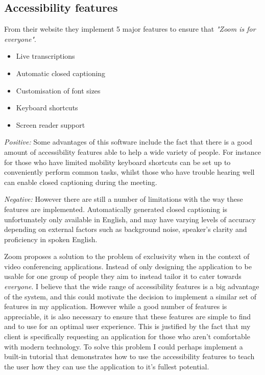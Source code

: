 \subsection*{Accessibility features}

From their website
\cite{zoom} they implement 5 major features to ensure that
\textit{"Zoom is for everyone"}.

\begin{itemize}
  \item Live transcriptions
  \item Automatic closed captioning
  \item Customisation of font sizes
  \item Keyboard shortcuts
  \item Screen reader support
\end{itemize}

\textit{Positive:}
Some advantages of this software include the fact that there
is a good amount of accessibility features able to help a wide
variety of people. For instance for those who have limited
mobility keyboard shortcuts can be set up to conveniently
perform common tasks, whilst those who have trouble hearing
well can enable closed captioning during the meeting.

\vspace{0.2cm}

\textit{Negative:}
However there are still a number of limitations with the way
these features are implemented. Automatically generated
closed captioning is unfortunately only available in English,
and may have varying levels of accuracy depending on external
factors such as background noise, speaker's clarity and
proficiency in spoken English.

\vspace{0.2cm}

Zoom proposes a solution to the problem of exclusivity when in
the context of video conferencing applications. Instead of only
designing the application to be usable for one group of people
they aim to instead tailor it to cater towards
\textit{everyone}. I believe that the wide range of
accessibility features is a big advantage of the system, and
this could motivate the decision to implement a similar set
of features in my application. However while a good number of
features is appreciable, it is also necessary to ensure that
these features are simple to find and to use for an optimal
user experience. This is justified by the fact that my client
is specifically requesting an application for those who aren't
comfortable with modern technology. To solve this problem I
could perhaps implement a built-in tutorial that demonstrates
how to use the accessibility features to teach the user how
they can use the application to it's fullest potential.

